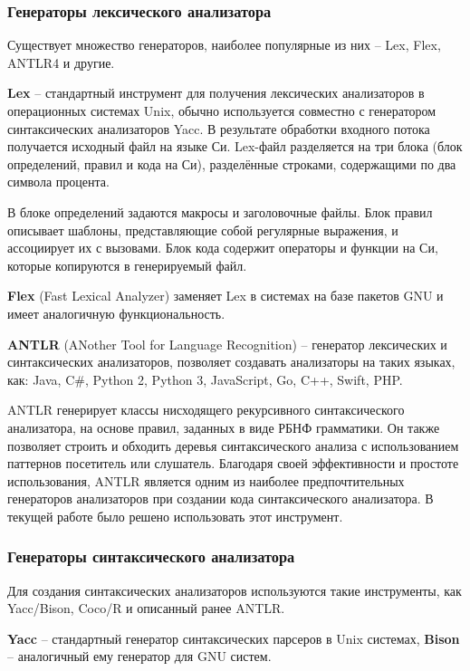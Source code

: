 \subsubsection{Генераторы лексического анализатора}
Существует множество генераторов, наиболее популярные из них -- Lex, Flex, ANTLR4 и другие. 

\textbf{Lex} -- стандартный инструмент для получения лексических анализаторов в операционных системах Unix, обычно используется совместно с генератором синтаксических анализаторов Yacc. В результате обработки входного потока получается исходный файл на языке Си. Lex-файл разделяется на три блока (блок определений, правил и кода на Си), разделённые строками, содержащими по два символа процента. \cite{bib:lex}

В блоке определений задаются макросы и заголовочные файлы. Блок правил описывает шаблоны, представляющие собой регулярные выражения, и ассоциирует их с вызовами. Блок кода  содержит операторы и функции на Си, которые копируются в генерируемый файл.

\textbf{Flex} (Fast Lexical Analyzer) заменяет Lex в системах на базе пакетов GNU и имеет аналогичную функциональность. \cite{bib:flex}

\textbf{ANTLR} (ANother Tool for Language Recognition) -- генератор лексических и синтаксических анализаторов, позволяет создавать анализаторы на таких языках, как: Java, C\#, Python 2, Python 3, JavaScript, Go, C++, Swift, PHP. \cite{bib:antlr4}

ANTLR генерирует классы нисходящего рекурсивного синтаксического анализатора, на основе правил, заданных в виде РБНФ грамматики. Он также позволяет строить и обходить деревья синтаксического анализа с использованием паттернов посетитель или слушатель. Благодаря своей эффективности и
простоте использования, ANTLR является одним из наиболее предпочтительных генераторов анализаторов при создании кода синтаксического анализатора. В текущей работе было решено использовать этот инструмент. \\

\subsubsection{Генераторы синтаксического анализатора}
Для создания синтаксических анализаторов используются такие инструменты, как Yacc/Bison, Coco/R и описанный ранее ANTLR.

\textbf{Yacc} -- стандартный генератор синтаксических парсеров в Unix системах, \textbf{Bison} -- аналогичный ему генератор для GNU систем. \cite{bib:bison}

